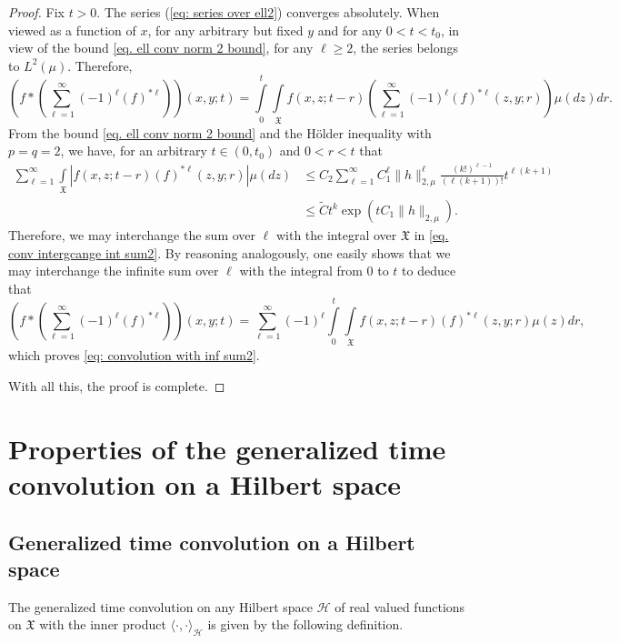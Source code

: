 \documentclass[11pt,reqno]{amsart}
\theoremstyle{remark}
\theoremstyle{definition}
\numberwithin{theorem}{section} \numberwithin{equation}{section}
\newcommand{\X}{\mathfrak{X}}
\begin{document}
\begin{proof}
Fix $t>0$. The series (\ref{eq: series over ell2}) converges absolutely.  When viewed as
a function of $x$, for any arbitrary but fixed $y$ and for any $0<t<t_0$, in view of the bound \eqref{eq. ell conv norm 2 bound}, for any $\ell\geq 2$, the series belongs to $L^{2}(\mu)$. Therefore,
\begin{equation}\label{eq. conv intergcange int sum2}
\left(f\ast\left(\sum_{\ell=1}^{\infty}(-1)^{\ell}(f)^{\ast\ell}\right)\right)(x,y;t)= \int\limits_0^t \int\limits_{\X} f(x,z;t-r) \left( \sum_{\ell=1}^{\infty} (-1)^\ell (f)^{\ast \ell}(z,y;r)\right) \mu(dz)  dr.
\end{equation}
From the bound \eqref{eq. ell conv norm 2 bound} and the H\" older inequality with $p=q=2$, we have, for an arbitrary $t\in(0,t_0)$ and $0<r<t$ that
\begin{align*}
\sum_{\ell=1}^{\infty} \int\limits_{\X} \left| f(x,z;t-r) (f)^{\ast \ell}(z,y;r)\right|\mu(dz)& \leq C_2\sum_{\ell=1}^{\infty}C_1^{\ell}\|h\|_{2,\mu}^{\ell} \frac{(k!)^{\ell-1}}{(\ell(k+1))!}t^{\ell(k+1)}\\ &\leq \tilde C t^k \exp(tC_1\|h\|_{2,\mu} ).
\end{align*}
Therefore, we may interchange the sum over $\ell$ with the integral over $\X$ in \eqref{eq. conv intergcange int sum2}.
By reasoning analogously, one easily shows that we may interchange the infinite sum over $\ell$ with the integral from $0$ to $t$ to deduce that
$$
\left(f\ast\left(\sum_{\ell=1}^{\infty}(-1)^{\ell}(f)^{\ast\ell}\right)\right)(x,y;t)= \sum_{\ell=1}^{\infty} (-1)^\ell \int\limits_0^t \int\limits_{\X} f(x,z;t-r)(f)^{\ast \ell}(z,y;r)\mu(z)  dr,
$$
which proves \eqref{eq: convolution with inf sum2}.

With all this, the proof is complete.
\end{proof}

\section{Properties of the generalized time convolution on a Hilbert space}

\subsection{Generalized time convolution on a Hilbert space}

The generalized time convolution on any Hilbert space $\mathcal{H}$ of real valued functions on $\X$ with the inner product
$\langle \cdot, \cdot \rangle_{\mathcal{H}}$ is given by the following definition.
\end{document}
